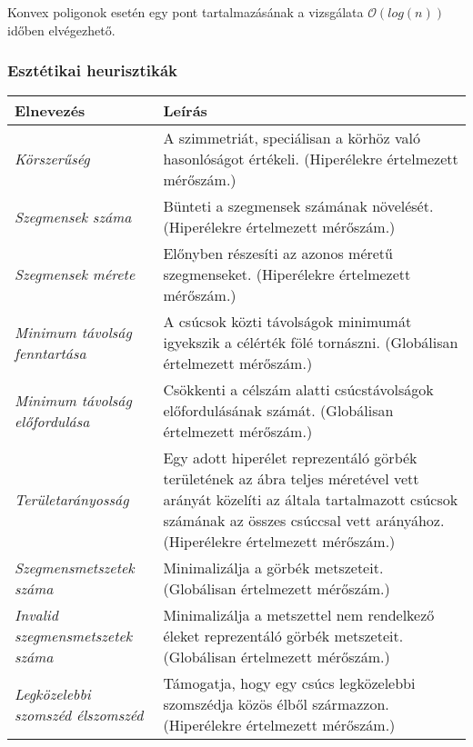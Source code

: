 \begin{note}
Konvex poligonok esetén egy pont tartalmazásának a vizsgálata $\mathcal{O}(log(n))$ időben elvégezhető\cite{point_polygon_test}.
\end{note}

\subsubsection{Esztétikai heurisztikák}

\begin{longtable}{| p{} | p{} |}
		\hline
		\textbf{Elnevezés} & \textbf{Leírás} \\
		\hline \hline %
		\emph{Körszerűség} & A szimmetriát, speciálisan a körhöz való hasonlóságot értékeli. (Hiperélekre értelmezett mérőszám.) \\
		\hline
		\emph{Szegmensek száma} & Bünteti a szegmensek számának növelését. (Hiperélekre értelmezett mérőszám.) \\
		\hline
		\emph{Szegmensek mérete} & Előnyben részesíti az azonos méretű szegmenseket. (Hiperélekre értelmezett mérőszám.) \\
		\hline
		\emph{Minimum távolság fenntartása} & A csúcsok közti távolságok minimumát igyekszik a célérték fölé tornászni. (Globálisan értelmezett mérőszám.)\\
		\hline
		\emph{Minimum távolság előfordulása} & Csökkenti a célszám alatti csúcstávolságok előfordulásának számát. (Globálisan értelmezett mérőszám.) \\
		\hline
		\emph{Területarányosság} & Egy adott hiperélet reprezentáló görbék területének az ábra teljes méretével vett arányát közelíti az általa tartalmazott csúcsok számának az összes csúccsal vett arányához. (Hiperélekre értelmezett mérőszám.) \\
		\hline
		\emph{Szegmensmetszetek száma} & Minimalizálja a görbék metszeteit. (Globálisan értelmezett mérőszám.)\\
		\hline
		\emph{Invalid szegmensmetszetek száma} & Minimalizálja a metszettel nem rendelkező éleket reprezentáló görbék metszeteit. (Globálisan értelmezett mérőszám.)\\
		\hline
		\emph{Legközelebbi szomszéd élszomszéd} & Támogatja, hogy egy csúcs legközelebbi szomszédja közös élből származzon. (Hiperélekre értelmezett mérőszám.)\\
		\hline
\end{longtable}

